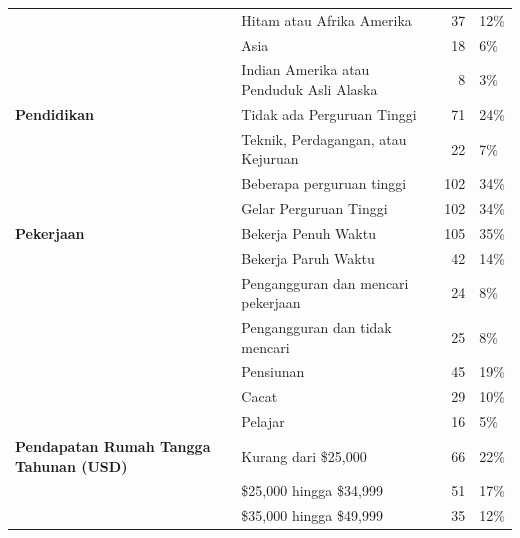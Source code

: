 \documentclass[lettersize,journal]{IEEEtran}
\begin{document}
\begin{table}[h!]
\begin{tabular}{@{}llrl@{}}
                                           & Hitam atau Afrika Amerika        & 37         & 12\%        \\
                                           & Asia                            & 18         & 6\%         \\
                                           & Indian Amerika atau Penduduk Asli Alaska & 8          & 3\%         \\ \midrule
    \textbf{Pendidikan}                     & Tidak ada Perguruan Tinggi                       & 71         & 24\%        \\
                                           & Teknik, Perdagangan, atau Kejuruan  & 22         & 7\%         \\
                                           & Beberapa perguruan tinggi                     & 102        & 34\%        \\
                                           & Gelar Perguruan Tinggi                   & 102        & 34\%        \\ \midrule
    \textbf{Pekerjaan}                    & Bekerja Penuh Waktu               & 105        & 35\%        \\
                                           & Bekerja Paruh Waktu               & 42         & 14\%        \\
                                           & Pengangguran dan mencari pekerjaan  & 24         & 8\%         \\
                                           & Pengangguran dan tidak mencari       & 25         & 8\%         \\
                                           & Pensiunan                          & 45         & 19\%        \\
                                           & Cacat                         & 29         & 10\%        \\
                                           & Pelajar                          & 16         & 5\%         \\ \midrule
    \textbf{Pendapatan Rumah Tangga Tahunan (USD)} & Kurang dari \$25,000               & 66         & 22\%        \\
                                           & \$25,000 hingga \$34,999             & 51         & 17\%        \\
                                           & \$35,000 hingga \$49,999             & 35         & 12\%        \\

\end{tabular}
\end{table}
\end{document}
